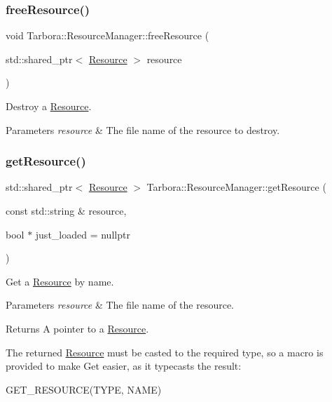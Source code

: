 \subsubsection{\texorpdfstring{free\+Resource()}{freeResource()}}
{\footnotesize\ttfamily void Tarbora\+::\+Resource\+Manager\+::free\+Resource (\begin{DoxyParamCaption}\item[{std\+::shared\+\_\+ptr$<$ \hyperlink{classTarbora_1_1Resource}{Resource} $>$}]{resource }\end{DoxyParamCaption})\hspace{0.3cm}{\ttfamily [static]}}



Destroy a \hyperlink{classTarbora_1_1Resource}{Resource}. 


\begin{DoxyParams}{Parameters}
{\em resource} & The file name of the resource to destroy. \\
\hline
\end{DoxyParams}
\mbox{\label{classTarbora_1_1ResourceManager_a2c160dc338dfbfecc0b6f7d5a5da981e}} 
\subsubsection{\texorpdfstring{get\+Resource()}{getResource()}}
{\footnotesize\ttfamily std\+::shared\+\_\+ptr$<$ \hyperlink{classTarbora_1_1Resource}{Resource} $>$ Tarbora\+::\+Resource\+Manager\+::get\+Resource (\begin{DoxyParamCaption}\item[{const std\+::string \&}]{resource,  }\item[{bool $\ast$}]{just\+\_\+loaded = {\ttfamily nullptr} }\end{DoxyParamCaption})\hspace{0.3cm}{\ttfamily [static]}}



Get a \hyperlink{classTarbora_1_1Resource}{Resource} by name. 


\begin{DoxyParams}{Parameters}
{\em resource} & The file name of the resource. \\
\hline
\end{DoxyParams}
\begin{DoxyReturn}{Returns}
A pointer to a \hyperlink{classTarbora_1_1Resource}{Resource}.
\end{DoxyReturn}
The returned \hyperlink{classTarbora_1_1Resource}{Resource} must be casted to the required type, so a macro is provided to make Get easier, as it typecasts the result\+: 
\begin{DoxyCode}
GET\_RESOURCE(TYPE, NAME)
\end{DoxyCode}


